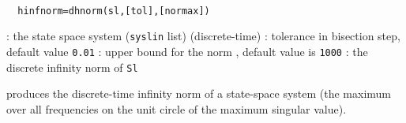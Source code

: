 \begin{mandesc}
   \\ %
\end{mandesc}
\begin{calling_sequence}
\begin{verbatim}
  hinfnorm=dhnorm(sl,[tol],[normax])  
\end{verbatim}
\end{calling_sequence}
\begin{parameters}
  \begin{varlist}
    : the state space system (\verb!syslin! list) (discrete-time)
    : tolerance in bisection step, default value \verb!0.01!
    : upper bound for the norm , default value is \verb!1000!
    : the discrete infinity norm of \verb!Sl!
  \end{varlist}
\end{parameters}
\begin{mandescription}
  produces the discrete-time infinity norm  of a state-space system 
  (the maximum over all frequencies on the unit circle of the maximum singular value).
\end{mandescription}
\begin{manseealso}
     
\end{manseealso}
